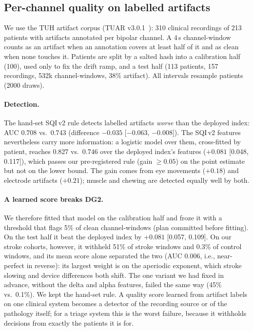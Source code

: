 \documentclass[sigconf,review,anonymous]{acmart}
\newcommand{\sqiv}{SQI\,v2}
\begin{document}
\subsection{Per-channel quality on labelled artifacts}
We use the TUH artifact corpus (TUAR v3.0.1~\cite{hamid2020tuar}): 310 clinical recordings of 213 patients with artifacts annotated per bipolar channel. A 4\,s channel-window counts as an artifact when an annotation covers at least half of it and as clean when none touches it. Patients are split by a salted hash into a calibration half (100), used only to fix the drift ramp, and a test half (113 patients, 157 recordings, 532k channel-windows, 38\% artifact). All intervals resample patients (2000 draws).

\paragraph{Detection.}
The hand-set \sqiv{} rule detects labelled artifacts \emph{worse} than the deployed index: AUC 0.708 vs.\ 0.743 (difference $-0.035$ [$-0.063$, $-0.008$]). The \sqiv{} features nevertheless carry more information: a logistic model over them, cross-fitted by patient, reaches 0.827 vs.\ 0.746 over the deployed index's features ($+0.081$ [0.048, 0.117]), which passes our pre-registered rule (gain $\ge 0.05$) on the point estimate but not on the lower bound. The gain comes from eye movements ($+0.18$) and electrode artifacts ($+0.21$); muscle and chewing are detected equally well by both.

\paragraph{A learned score breaks DG2.}
We therefore fitted that model on the calibration half and froze it with a threshold that flags 5\% of clean channel-windows (plan committed before fitting). On the test half it beat the deployed index by $+0.081$ [0.057, 0.109]. On our stroke cohorts, however, it withheld 51\% of stroke windows and 0.3\% of control windows, and its mean score alone separated the two (AUC 0.006, i.e., near-perfect in reverse): its largest weight is on the aperiodic exponent, which stroke slowing and device differences both shift. The one variant we had fixed in advance, without the delta and alpha features, failed the same way (45\% vs.\ 0.1\%). We kept the hand-set rule. A quality score learned from artifact labels on one clinical system becomes a detector of the recording source or of the pathology itself; for a triage system this is the worst failure, because it withholds decisions from exactly the patients it is for.
\end{document}
